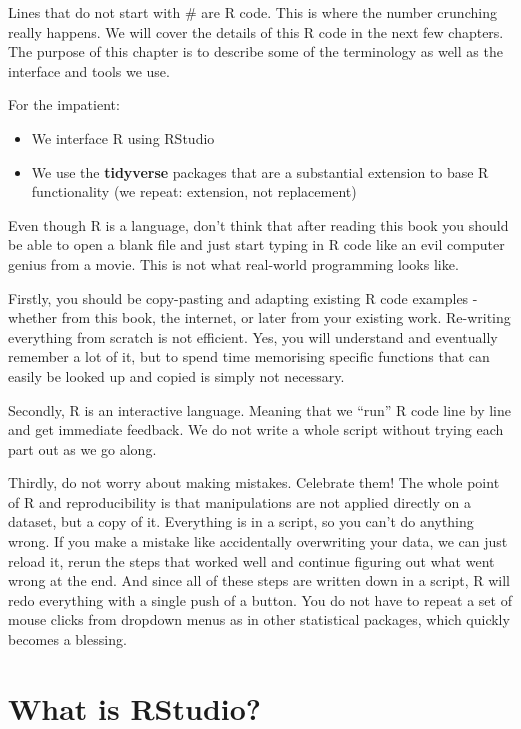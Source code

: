 \documentclass[
  12pt,
  krantz2]{krantz}
\providecommand{\tightlist}{%
  \setlength{\itemsep}{0pt}\setlength{\parskip}{0pt}}
\begin{document}
Lines that do not start with \# are R code.
This is where the number crunching really happens.
We will cover the details of this R code in the next few chapters.
The purpose of this chapter is to describe some of the terminology as well as the interface and tools we use.

For the impatient:

\begin{itemize}
\tightlist
\item
  We interface R using RStudio
\item
  We use the \textbf{tidyverse} packages that are a substantial extension to base R functionality (we repeat: extension, not replacement)
\end{itemize}

Even though R is a language, don't think that after reading this book you should be able to open a blank file and just start typing in R code like an evil computer genius from a movie.
This is not what real-world programming looks like.

Firstly, you should be copy-pasting and adapting existing R code examples - whether from this book, the internet, or later from your existing work.
Re-writing everything from scratch is not efficient.
Yes, you will understand and eventually remember a lot of it, but to spend time memorising specific functions that can easily be looked up and copied is simply not necessary.

Secondly, R is an interactive language.
Meaning that we ``run'' R code line by line and get immediate feedback.
We do not write a whole script without trying each part out as we go along.

Thirdly, do not worry about making mistakes.
Celebrate them!
The whole point of R and reproducibility is that manipulations are not applied directly on a dataset, but a copy of it.
Everything is in a script, so you can't do anything wrong.
If you make a mistake like accidentally overwriting your data, we can just reload it, rerun the steps that worked well and continue figuring out what went wrong at the end.
And since all of these steps are written down in a script, R will redo everything with a single push of a button.
You do not have to repeat a set of mouse clicks from dropdown menus as in other statistical packages, which quickly becomes a blessing.

\hypertarget{what-is-rstudio}{%
\section{What is RStudio?}\label{what-is-rstudio}}
\end{document}
